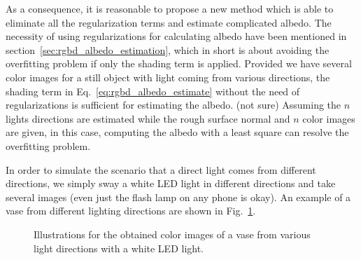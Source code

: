 As a consequence, it is reasonable to propose a new method which is able to eliminate all the regularization terms and estimate complicated albedo.
The necessity of using regularizations for calculating albedo have been mentioned in section~\ref{sec:rgbd_albedo_estimation}, which in short is about avoiding the overfitting problem if only the shading term is applied.
Provided we have several color images for a still object with light coming from various directions, the shading term in Eq.~\ref{eq:rgbd_albedo_estimate} without the need of regularizations is sufficient for estimating the albedo.
{\color{blue} (not sure) Assuming the $n$ lights directions are estimated while the rough surface normal and $n$ color images are given, in this case, computing the albedo with a least square can resolve the overfitting problem.}

In order to simulate the scenario that a direct light comes from different directions, we simply sway a white LED light in different directions and take several images (even just the flash lamp on any phone is okay). An example of a vase from different lighting directions are shown in Fig.~\ref{fig:robust_setup}.

\begin{figure}[!htbp]
\centering
{}
\caption{Illustrations for the obtained color images of a vase from various light directions with a white LED light.}
\label{fig:robust_setup}
\end{figure}
 
